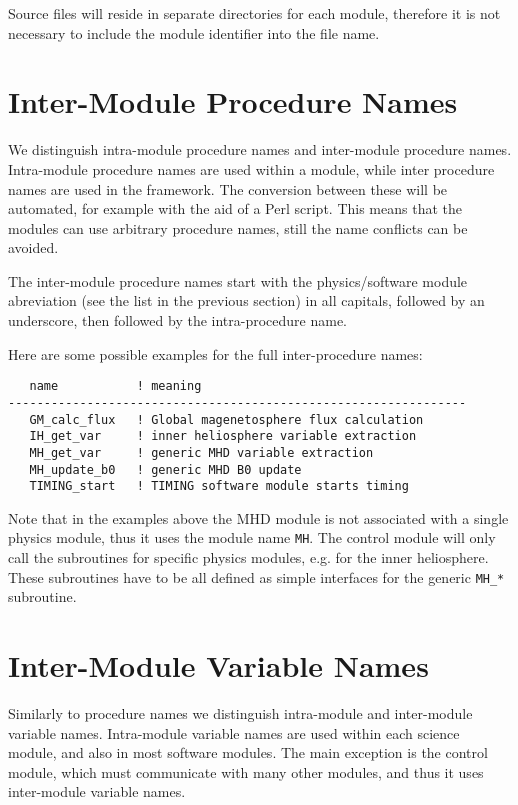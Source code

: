 Source files will reside in separate directories for each
module, therefore it is not necessary to include the
module identifier into the file name.

\section{Inter-Module Procedure Names}

We distinguish intra-module procedure names and inter-module 
procedure names. Intra-module procedure names are used within a module,
while inter procedure names are used in the framework.
The conversion between these will be automated, for example with 
the aid of a Perl script. This means that the modules can use 
arbitrary procedure names, still the name conflicts can be avoided. 

The inter-module procedure names start with the physics/software module 
abreviation (see the list in the previous section) 
in all capitals, followed by an underscore, then followed by the
intra-procedure name. 

Here are some possible examples for the full inter-procedure names:
\begin{verbatim}
   name           ! meaning
----------------------------------------------------------------
   GM_calc_flux   ! Global magenetosphere flux calculation
   IH_get_var     ! inner heliosphere variable extraction
   MH_get_var     ! generic MHD variable extraction
   MH_update_b0   ! generic MHD B0 update
   TIMING_start   ! TIMING software module starts timing
\end{verbatim}
Note that in the examples above the MHD module is not associated with 
a single physics module, thus it uses the module name {\tt MH}.
The control module will only call the subroutines for specific 
physics modules, e.g. for the inner heliosphere. These subroutines
have to be all defined as simple interfaces for the
generic {\tt MH\_*} subroutine.

\section{Inter-Module Variable Names}

Similarly to procedure names we distinguish intra-module and
inter-module variable names. Intra-module variable names 
are used within each science module, and also in most software
modules. The main exception is the control module, which must
communicate with many other modules, and thus it uses 
inter-module variable names.

